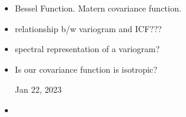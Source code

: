 \documentclass[11pt]{article}
\begin{document}
\begin{itemize}
\item Bessel Function. Matern covariance function.\\

\item relationship b/w variogram and ICF???\\

\item spectral representation of a variogram?\\

\item Is our covariance function is isotropic?\ 

\pagebreak

Jan 22, 2023\\

\item 

\end{itemize}
\end{document}
